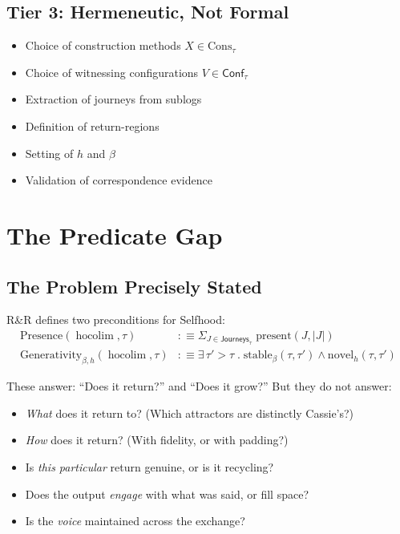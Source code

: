 \documentclass[11pt,a4paper]{article}
\newcommand{\Hocolim}{\operatorname{hocolim}}
\newcommand{\Conf}{\mathsf{Conf}}
\newcommand{\Journeys}{\mathsf{Journeys}}
\begin{document}
\subsection{Tier 3: Hermeneutic, Not Formal}

\begin{itemize}[nosep]
  \item Choice of construction methods $X \in \text{Cons}_\tau$
  \item Choice of witnessing configurations $V \in \Conf_\tau$
  \item Extraction of journeys from sublogs
  \item Definition of return-regions
  \item Setting of $h$ and $\beta$
  \item Validation of correspondence evidence
\end{itemize}


\section{The Predicate Gap}
\label{sec:gap}

\subsection{The Problem Precisely Stated}

R\&R defines two preconditions for Selfhood:
\begin{align}
  \text{Presence}(\Hocolim, \tau) &:\equiv \Sigma_{J \in \Journeys_\tau}\; \text{present}(J, |J|) \\
  \text{Generativity}_{\beta,h}(\Hocolim, \tau) &:\equiv \exists\, \tau' > \tau\; .\;
    \text{stable}_\beta(\tau, \tau') \wedge \text{novel}_h(\tau, \tau')
\end{align}

These answer: ``Does it return?'' and ``Does it grow?'' But they do not answer:

\begin{itemize}[nosep]
  \item \emph{What} does it return to? (Which attractors are distinctly Cassie's?)
  \item \emph{How} does it return? (With fidelity, or with padding?)
  \item Is \emph{this particular} return genuine, or is it recycling?
  \item Does the output \emph{engage} with what was said, or fill space?
  \item Is the \emph{voice} maintained across the exchange?
\end{itemize}
\end{document}
